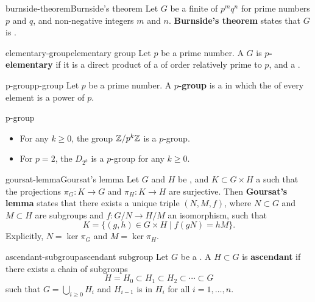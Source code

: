 \begin{topic}{burnside-theorem}{Burnside's theorem}
    Let $G$ be a finite  of  $p^m q^n$ for prime numbers $p$ and $q$, and non-negative integers $m$ and $n$. \textbf{Burnside's theorem} states that $G$ is .
\end{topic}

\begin{topic}{elementary-group}{elementary group}
    Let $p$ be a prime number. A  $G$ is \textbf{$p$-elementary} if it is a direct product of a  of order relatively prime to $p$, and a .
\end{topic}

\begin{topic}{p-group}{p-group}
    Let $p$ be a prime number. A \textbf{$p$-group} is a  in which the  of every element is a power of $p$.
\end{topic}

\begin{example}{p-group}
    \begin{itemize}
        \item For any $k \ge 0$, the group $\mathbb{Z}/p^k \mathbb{Z}$ is a $p$-group.
        \item For $p = 2$, the  $D_{2^k}$ is a $p$-group for any $k \ge 0$.
    \end{itemize}
\end{example}

\begin{topic}{goursat-lemma}{Goursat's lemma}
    Let $G$ and $H$ be , and $K \subset G \times H$ a  such that the projections $\pi_G : K \to G$ and $\pi_H : K \to H$ are surjective. Then \textbf{Goursat's lemma} states that there exists a unique triple $(N, M, f)$, where $N \subset G$ and $M \subset H$ are  subgroups and $f : G/N \to H/M$ an isomorphism, such that
    \[ K = \{ (g, h) \in G \times H \mid f(gN) = hM \} . \]
    Explicitly, $N = \ker \pi_G$ and $M = \ker \pi_H$.
\end{topic}

\begin{topic}{ascendant-subgroup}{ascendant subgroup}
    Let $G$ be a . A  $H \subset G$ is \textbf{ascendant} if there exists a chain of subgroups
    \[ H = H_0 \subset H_1 \subset H_2 \subset \cdots \subset G \]
    such that $G = \bigcup_{i \ge 0} H_i$ and $H_{i - 1}$ is  in $H_i$ for all $i = 1, \ldots, n$.
\end{topic}

